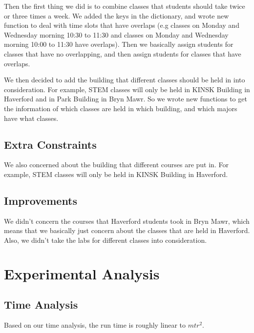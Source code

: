 \documentclass[11pt, oneside]{article}   	%
\begin{document}
Then the first thing we did is to combine classes that students should take twice or three times a week. We added the keys in the dictionary, and wrote new function to deal with time slots that have overlaps (e.g classes on Monday and Wednesday morning 10:30 to 11:30 and classes on Monday and Wednesday morning 10:00 to 11:30 have overlaps). Then we basically assign students for classes that have no overlapping, and then assign students for classes that have overlaps. 

We then decided to add the building that different classes should be held in into consideration. For example, STEM classes will only be held in KINSK Building in Haverford and in Park Building in Bryn Mawr. So we wrote new functions to get the information of which classes are held in which building, and which majors have what classes.

\subsection{Extra Constraints}
We also concerned about the building that different courses are put in. For example, STEM classes will only be held in KINSK Building in Haverford. 



\subsection{Improvements}
We didn't concern the courses that Haverford students took in Bryn Mawr, which means that we basically just concern about the classes that are held in Haverford. Also, we didn't take the labs for different classes into consideration.



\newpage
\section{Experimental Analysis}
\subsection{Time Analysis}
Based on our time analysis, the run time is roughly linear to $mtr^2$.
\end{document}
